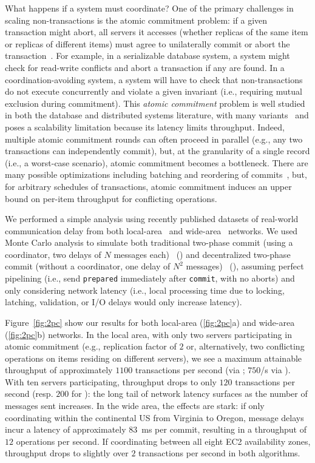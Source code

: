 What happens if a system must coordinate? One of the primary
challenges in scaling non-\cfree transactions is the atomic commitment
problem: if a given transaction might abort, all servers it accesses
(whether replicas of the same item or replicas of different items)
must agree to unilaterally commit or abort the
transaction~\cite{bernstein-book}. For example, in a serializable
database system, a system might check for read-write conflicts and
abort a transaction if any are found. In a coordination-avoiding
system, a system will have to check that non-\iconfluent transactions
do not execute concurrently and violate a given invariant (i.e.,
requiring mutual exclusion during commitment). This \textit{atomic
  commitment} problem is well studied in both the database and
distributed systems literature, with many
variants~\cite{atomictransactions,paxos-commit,traiger-tods} and poses
a scalability limitation because its latency limits
throughput. Indeed, multiple atomic commitment rounds can often
proceed in parallel (e.g., any two \iconfluent transactions can
independently commit), but, at the granularity of a single record
(i.e., a worst-case scenario), atomic commitment becomes a
bottleneck. There are many possible optimizations including batching
and reordering of commits~\cite{calvin}, but, for arbitrary schedules
of transactions, atomic commitment induces an upper bound on per-item
throughput for conflicting operations.

We performed a simple analysis using recently published datasets of
real-world communication delay from both local-area~\cite{bobtail} and
wide-area~\cite{hat-vldb} networks. We used Monte Carlo analysis to
simulate both traditional two-phase commit (using a coordinator, two
delays of $N$ messages each)~\cite{bernstein-book} (\cpc) and
decentralized two-phase commit (without a coordinator, one delay of
$N^2$ messages)~\cite{paxos-commit} (\dpc), assuming perfect
pipelining (i.e., send \texttt{prepared} immediately after
\texttt{commit}, with no aborts) and only considering network latency
(i.e., local processing time due to locking, latching, validation, or
I/O delays would only increase latency).

Figure~\ref{fig:2pc} show our results for both local-area
(\ref{fig:2pc}a) and wide-area (\ref{fig:2pc}b) networks.  In the
local area, with only two servers participating in atomic commitment
(e.g., replication factor of $2$ or, alternatively, two conflicting
operations on items residing on different servers), we see a maximum
attainable throughput of approximately $1100$ transactions per second
(via \dpc; $750$/s via \cpc). With ten servers participating, \dpc
throughput drops to only $120$ transactions per second (resp. $200$
for \cpc): the long tail of network latency surfaces as the number of
messages sent increases. In the wide area, the effects are stark: if
only coordinating within the continental US from Virginia to Oregon,
\dpc message delays incur a latency of approximately $83$~ms per
commit, resulting in a throughput of $12$ operations per second. If
coordinating between all eight EC2 availability zones, throughput
drops to slightly over $2$ transactions per second in both algorithms.

